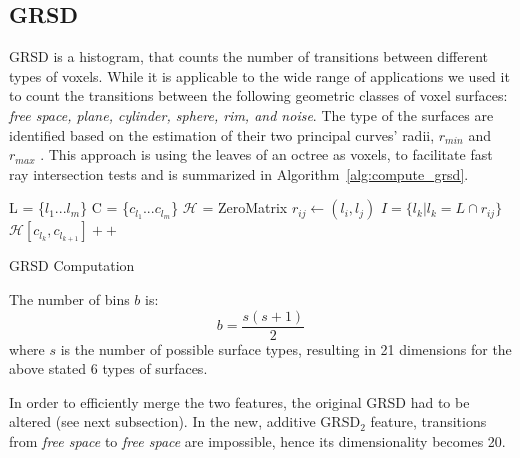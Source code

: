 \documentclass[letterpaper, 10 pt, conference]{sty/ieeeconf}
\def\cH{\mathcal{H}}
\begin{document}
\subsection{GRSD}
\label{sec:grsd}
GRSD is a histogram, that counts the number of transitions between different types of voxels.
While it is applicable to the wide range of applications we used it to count the transitions between 
the following geometric classes of voxel surfaces: \emph{free space, plane, cylinder, sphere, rim, and noise}.
The type of the surfaces are identified based on the estimation of their
two principal curves' radii, $r_{min}$ and $r_{max}$ \cite{Marton10IROS}. 
This approach is using the leaves of an octree as voxels, to facilitate fast ray intersection
tests and is summarized in Algorithm~\ref{alg:compute_grsd}.
\begin{algorithm}[htb!]
L = \{$l_{1}...l_{m}$\} 
C = \{$c_{l_1}...c_{l_m}$\} 
$\cH$ = ZeroMatrix 
  {
    {
      $r_{ij} \leftarrow (l_{i},l_{j})$ 
      $I = \{l_{k}|l_{k} = L \cap r_{ij}\}$ 
      {
        $\cH[c_{l_k},c_{l_{k+1}}]++$ 
      }
    }
  }
  \caption{GRSD Computation}
  \label{alg:compute_grsd}
\end{algorithm}
The number of bins $b$ is:
\begin{equation}
b=\frac{s(s+1)}{2}
\end{equation}
where $s$ is the number of possible surface types,
resulting in 21 dimensions for the above stated 6 types of surfaces.

In order to efficiently merge the two features, the original GRSD had to be altered (see next subsection). 
In the new, additive GRSD$_2$ feature, transitions from \emph{free space} to \emph{free space} are impossible,
hence its dimensionality becomes 20.
\end{document}
